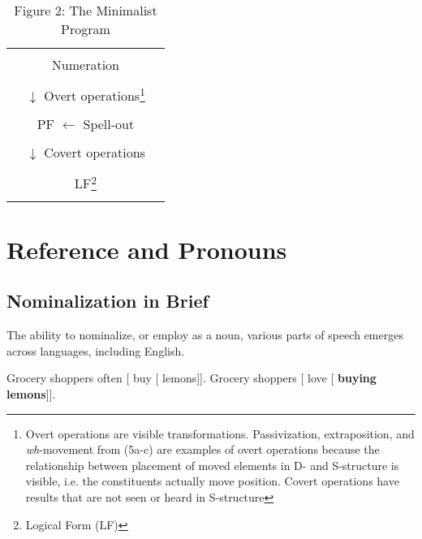 \documentclass{article}
\begin{document}
\begin{table}[btp] 
\centering
    \begin{tabular}{|c c c|}
    \hline
         & & \\
         & Numeration &  \\
         & & \\
         & \hspace{1.05in} $\downarrow$ Overt operations\footnote{Overt operations are visible transformations. Passivization, extraposition, and \textit{wh}-movement from (5a-c) are examples of overt operations because the relationship between placement of moved elements in D- and S-structure is visible, i.e. the constituents actually move position. Covert operations have results that are not seen or heard in S-structure} &  \\
         & & \\
         & \hspace{-0.35in} PF $\leftarrow$ Spell-out &  \\
         & & \\
         & \hspace{1in} $\downarrow$ Covert operations & \\
         & & \\
         & \hspace{.05in}LF\footnote{Logical Form (LF)} & \\
         & & \\
    \hline
    \end{tabular}
\caption*{Figure 2: The Minimalist Program \citep{Chomsky95, Ko14}}
\end{table}


\section{Reference and Pronouns}

\subsection{Nominalization in Brief}

The ability to nominalize, or employ as a noun, various parts of speech emerges across languages, including English.

\ea \label{Nom1}
    \begin{xlist}
        \ex Grocery shoppers often [ buy [ lemons]].
        \ex Grocery shoppers [ love [ \textbf{buying lemons}]].
    \end{xlist}
\z
\end{document}
